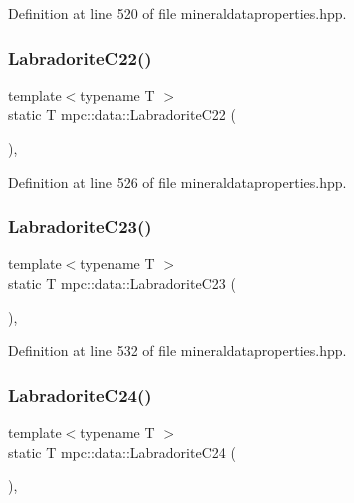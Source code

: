 Definition at line 520 of file mineraldataproperties.\+hpp.

\mbox{\label{namespacempc_1_1data_ac37f839c636ecb232d1b43802ed31cf6}} 
\subsubsection{\texorpdfstring{Labradorite\+C22()}{LabradoriteC22()}}
{\footnotesize\ttfamily template$<$typename T $>$ \\
static T mpc\+::data\+::\+Labradorite\+C22 (\begin{DoxyParamCaption}{ }\end{DoxyParamCaption})\hspace{0.3cm}{\ttfamily [inline]}, {\ttfamily [static]}}



Definition at line 526 of file mineraldataproperties.\+hpp.

\mbox{\label{namespacempc_1_1data_ac60e4bb4b4758b2240b1113bf76794bb}} 
\subsubsection{\texorpdfstring{Labradorite\+C23()}{LabradoriteC23()}}
{\footnotesize\ttfamily template$<$typename T $>$ \\
static T mpc\+::data\+::\+Labradorite\+C23 (\begin{DoxyParamCaption}{ }\end{DoxyParamCaption})\hspace{0.3cm}{\ttfamily [inline]}, {\ttfamily [static]}}



Definition at line 532 of file mineraldataproperties.\+hpp.

\mbox{\label{namespacempc_1_1data_a6f771709b41195e6ca988999c8633554}} 
\subsubsection{\texorpdfstring{Labradorite\+C24()}{LabradoriteC24()}}
{\footnotesize\ttfamily template$<$typename T $>$ \\
static T mpc\+::data\+::\+Labradorite\+C24 (\begin{DoxyParamCaption}{ }\end{DoxyParamCaption})\hspace{0.3cm}{\ttfamily [inline]}, {\ttfamily [static]}}



